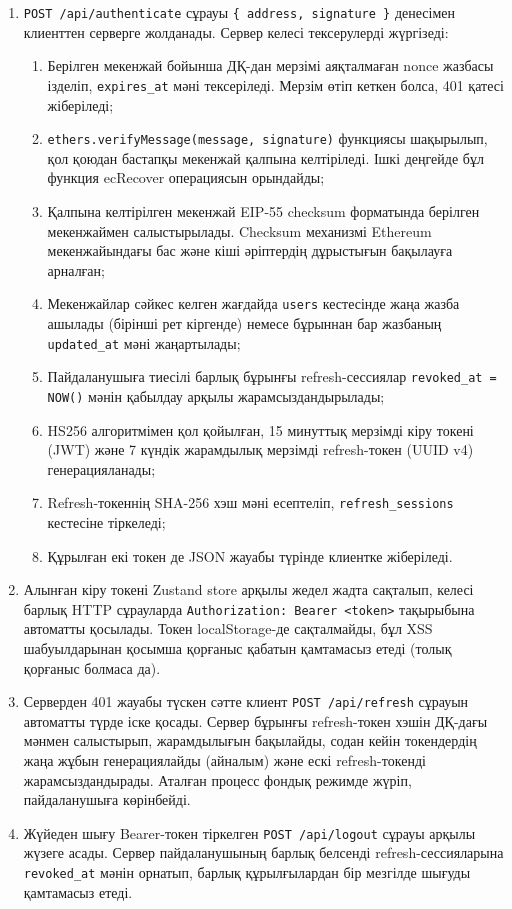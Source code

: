\documentclass[14pt,a4paper]{extarticle}
\begin{document}
\begin{enumerate}
\item \texttt{POST /api/authenticate} сұрауы \texttt{\{ address, signature \}} денесімен клиенттен серверге жолданады. Сервер келесі тексерулерді жүргізеді:
\begin{enumerate}[label=(\alph*), nosep]
\item Берілген мекенжай бойынша ДҚ-дан мерзімі аяқталмаған nonce жазбасы ізделіп, \texttt{expires\_at} мәні тексеріледі. Мерзім өтіп кеткен болса, 401 қатесі жіберіледі;
\item \texttt{ethers.verifyMessage(message, signature)} функциясы шақырылып, қол қоюдан бастапқы мекенжай қалпына келтіріледі. Ішкі деңгейде бұл функция ecRecover операциясын орындайды;
\item Қалпына келтірілген мекенжай EIP-55 checksum форматында берілген мекенжаймен салыстырылады. Checksum механизмі Ethereum мекенжайындағы бас және кіші әріптердің дұрыстығын бақылауға арналған;
\item Мекенжайлар сәйкес келген жағдайда \texttt{users} кестесінде жаңа жазба ашылады (бірінші рет кіргенде) немесе бұрыннан бар жазбаның \texttt{updated\_at} мәні жаңартылады;
\item Пайдаланушыға тиесілі барлық бұрынғы refresh-сессиялар \texttt{revoked\_at = NOW()} мәнін қабылдау арқылы жарамсыздандырылады;
\item HS256 алгоритмімен қол қойылған, 15 минуттық мерзімді кіру токені (JWT) және 7 күндік жарамдылық мерзімді refresh-токен (UUID v4) генерацияланады;
\item Refresh-токеннің SHA-256 хэш мәні есептеліп, \texttt{refresh\_sessions} кестесіне тіркеледі;
\item Құрылған екі токен де JSON жауабы түрінде клиентке жіберіледі.
\end{enumerate}

\item Алынған кіру токені Zustand store арқылы жедел жадта сақталып, келесі барлық HTTP сұрауларда \texttt{Authorization: Bearer <token>} тақырыбына автоматты қосылады. Токен localStorage-де сақталмайды, бұл XSS шабуылдарынан қосымша қорғаныс қабатын қамтамасыз етеді (толық қорғаныс болмаса да).

\item Серверден 401 жауабы түскен сәтте клиент \texttt{POST /api/refresh} сұрауын автоматты түрде іске қосады. Сервер бұрынғы refresh-токен хэшін ДҚ-дағы мәнмен салыстырып, жарамдылығын бақылайды, содан кейін токендердің жаңа жұбын генерациялайды (айналым) және ескі refresh-токенді жарамсыздандырады. Аталған процесс фондық режимде жүріп, пайдаланушыға көрінбейді.

\item Жүйеден шығу Bearer-токен тіркелген \texttt{POST /api/logout} сұрауы арқылы жүзеге асады. Сервер пайдаланушының барлық белсенді refresh-сессияларына \texttt{revoked\_at} мәнін орнатып, барлық құрылғылардан бір мезгілде шығуды қамтамасыз етеді.
\end{enumerate}
\end{document}
